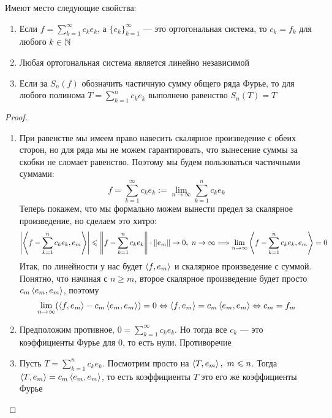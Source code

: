 \begin{proposition}
	Имеют место следующие свойства:
	\begin{enumerate}
		\item Если $f = \sum_{k = 1}^\infty c_ke_k$, а $\{e_k\}_{k = 1}^\infty$ --- это ортогональная система, то $c_k = f_k$ для любого $k \in \mathbb{N}$
		
		\item Любая ортогональная система является линейно независимой
		
		\item Если за $S_n(f)$ обозначить частичную сумму общего ряда Фурье, то для любого полинома $T = \sum_{k = 1}^n c_ke_k$ выполнено равенство $S_n(T) = T$
	\end{enumerate}
\end{proposition}

\begin{proof}~
	\begin{enumerate}
		\item При равенстве мы имеем право навесить скалярное произведение с обеих сторон, но для ряда мы не можем гарантировать, что вынесение суммы за скобки не сломает равенство. Поэтому мы будем пользоваться частичными суммами:
		\[
			f = \sum_{k = 1}^\infty c_ke_k := \lim_{n \to \infty} \sum_{k = 1}^n c_ke_k
		\]
		Теперь покажем, что мы формально можем вынести предел за скалярное произведение, но сделаем это хитро:
		\[
			\left|\left\langle f - \sum_{k = 1}^n c_ke_k, e_m\right\rangle\right| \leqslant \left\|f - \sum_{k = 1}^n c_ke_k\right\| \cdot \|e_m\| \to 0,\ n \to \infty \Longrightarrow \lim_{n \to \infty} \left\langle f - \sum_{k = 1}^n c_ke_k, e_m\right\rangle = 0
		\]
		Итак, по линейности у нас будет $\left\langle f, e_m\right\rangle$ и скалярное произведение с суммой. Понятно, что начиная с $n \ge m$, второе скалярное произведение будет просто $c_m\left\langle e_m, e_m\right\rangle$, поэтому
		\[
			\lim_{n \to \infty} (\left\langle f, e_m\right\rangle - c_m\left\langle e_m, e_m\right\rangle) = 0 \Leftrightarrow \left\langle f, e_m\right\rangle = c_m\left\langle e_m, e_m\right\rangle \Leftrightarrow c_m = f_m
		\]
		
		\item Предположим противное, $0 = \sum_{k = 1}^\infty c_ke_k$. Но тогда все $c_k$ --- это коэффициенты Фурье для 0, то есть нули. Противоречие
		
		\item Пусть $T = \sum_{k = 1}^n c_ke_k$. Посмотрим просто на $\left\langle T, e_m\right\rangle,\ m \leqslant n$. Тогда $\left\langle T, e_m\right\rangle = c_m\left\langle e_m, e_m\right\rangle$, то есть коэффициенты $T$ это его же коэффициенты Фурье
	\end{enumerate}
\end{proof}

